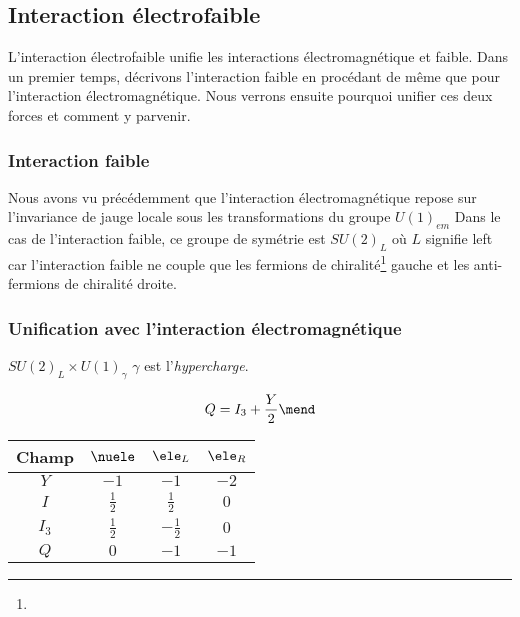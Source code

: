 \subsection{Interaction électrofaible}\label{chapter-MS-MSSM-section-formalisme-subsec-EW}
L'interaction électrofaible unifie les interactions électromagnétique et faible.
Dans un premier temps, décrivons l'interaction faible en procédant de même que pour l'interaction électromagnétique.
Nous verrons ensuite pourquoi unifier ces deux forces et comment y parvenir.

\subsubsection{Interaction faible}\label{chapter-MS-MSSM-section-formalisme-subsec-EW-subsubsec-weak}
Nous avons vu précédemment que l'interaction électromagnétique repose sur l'invariance de jauge locale sous les transformations du groupe $U(1)_{em}$
Dans le cas de l'interaction faible, ce groupe de symétrie est $SU(2)_L$ où $L$ signifie \og left \fg{} car l'interaction faible ne couple que les fermions de chiralité\footnote{} gauche et les anti-fermions de chiralité droite.

\subsubsection{Unification avec l'interaction électromagnétique}\label{chapter-MS-MSSM-section-formalisme-subsec-EW-subsubsec-unification}
$SU(2)_L \times U(1)_\gamma$
$\gamma$ est l'\emph{hypercharge}.

\begin{equation}
Q = I_3 + \frac{Y}{2}
\mend
\end{equation}

\begin{table}
\centering
\begin{tabular}{cccc}
\toprule
Champ & $\nuele$ & $\ele_L$ & $\ele_R$\\
\midrule
$Y$ & $-1$ & $-1$ & $-2$ \\
$I$ & $\frac{1}{2}$ & $\frac{1}{2}$ & $0$ \\
$I_3$ & $\frac{1}{2}$ & $-\frac{1}{2}$ & $0$ \\
\midrule
$Q$ & $0$ & $-1$ & $-1$\\
\bottomrule
\end{tabular}
\end{table}